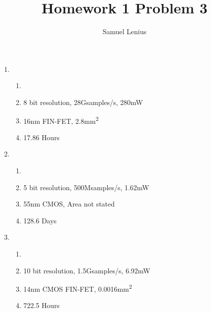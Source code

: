 \documentclass[conference]{IEEEtran}
\title{Homework 1 Problem 3}
\author{Samuel Lenius}
\begin{document}
\maketitle


\begin{enumerate}
  \item
    \begin{enumerate}[label=(\alph*)]
      \item \cite{7811205}
      \item 8 bit resolution, 28Gsamples/s, 280mW
      \item 16nm FIN-FET, 2.8mm\textsuperscript{2}
      \item 17.86 Hours
    \end{enumerate}
  \item
    \begin{enumerate}[label=(\alph*)]
      \item \cite{7904657}
      \item 5 bit resolution, 500Msamples/s, 1.62mW
      \item 55nm CMOS, Area not stated
      \item 128.6 Days
    \end{enumerate}
  \item
    \begin{enumerate}[label=(\alph*)]
      \item \cite{7870467}
      \item 10 bit resolution, 1.5Gsamples/s, 6.92mW
      \item 14nm CMOS FIN-FET, 0.0016mm\textsuperscript{2}
      \item 722.5 Hours
    \end{enumerate}
\end{enumerate}


\end{document}
